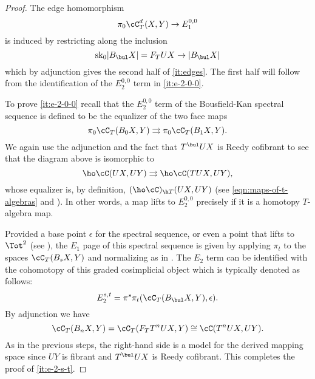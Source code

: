 \documentclass[leqno,oneside,english]{elsarticle}
\begin{document}
\begin{proof}
  The edge homomorphism 
  \[
  \pi_0 \cC_T^{d}(X,Y) \rightarrow E_1^{0,0} 
  \]
  is induced by restricting along the inclusion 
  \[
  \mathrm{sk}_0 |B_{\bul} X|=F_T UX\rightarrow |B_{\bul} X| 
  \] 
  which by adjunction gives the second half of \eqref{it:edges}. The
  first half will follow from the identification of the $E_2^{0,0}$
  term in \eqref{it:e-2-0-0}.
  
  To prove \eqref{it:e-2-0-0} recall that the $E_2^{0,0}$ term of the
  Bousfield-Kan spectral sequence is defined to be the equalizer of the
  two face maps 
  \[ 
  \pi_0 \cC_T(B_0 X, Y)\rightrightarrows \pi_0 \cC_T(B_1 X, Y).
  \]
  {{\ifshowsaveblocks
{}
\fi}}{}   We again use the adjunction and the fact that $T^{\bul}UX$ is Reedy cofibrant
   to see that the diagram above is isomorphic to
   \[
   \ho\cC(UX,UY)\rightrightarrows \ho\cC(TUX, UY),
   \] 
   whose equalizer is, by definition, $(\ho\cC)_{\h T}(UX,UY)$ (see
   \eqref{eqn:maps-of-t-algebras} and ).  In
   other words, a map lifts to $E_2^{0,0}$ precisely if it is a
   homotopy $T$-algebra map.

  Provided a base point $\epsilon$ for the spectral sequence, or even a
  point that lifts to $\Tot^2$ (see ), the $E_1$
  page of this spectral sequence is given by applying $\pi_t$ to the
  spaces $\cC_T(B_{s}X,Y)$ and normalizing as in \cite[\S~2.4]{Bou89}. The $E_2$
  term can be identified with the cohomotopy of this graded cosimplicial
  object which is typically denoted as follows:
  \[ 
  E_2^{s,t}=\pi^s\pi_t (\cC_T(B_{\bul} X, Y),\epsilon). 
  \]
  By adjunction we have 
  \[
  \cC_T(B_{n}X,Y) =\cC_T(F_T T^{n}UX,Y)\cong \cC(T^{n}UX,UY).
  \] 
  As in the previous steps, the right-hand side is a model for the
  derived mapping space since $UY$ is fibrant and $T^{\bul}UX$ is
  Reedy cofibrant.  This completes the proof of \eqref{it:e-2-s-t}.


\end{proof}
\end{document}

